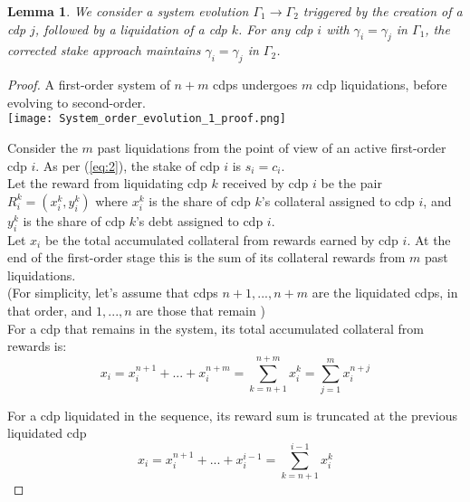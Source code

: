 \documentclass[reqno]{article}
\newtheorem{lemma}[theorem]{Lemma}
\begin{document}
\begin{lemma}\label{result:1} We consider a system evolution $\Gamma_1 \rightarrow \Gamma_2$ triggered by the creation of a cdp $j$, followed by a liquidation of a cdp $k$. For any cdp $i$ with $\gamma_i = \gamma_j$ in $\Gamma_1$, the corrected stake approach maintains $\gamma_i = \gamma_j$ in $\Gamma_2$.
\end{lemma}

\begin{proof}
A first-order system of $n+m$ cdps undergoes $m$ cdp liquidations, before evolving to second-order.\\

    \texttt{[image: System\_order\_evolution\_1\_proof.png]}

Consider the $m$ past liquidations from the point of view of an active first-order cdp $i$. As per (\ref{eq:2}), the stake of cdp $i$ is $s_i = c_i$.\\

Let the reward from liquidating cdp $k$ received by cdp $i$ be the pair $R_i^k = (x_i^k, y_i^k)$ where $x_i^k$ is the share of cdp $k$’s collateral assigned to cdp $i$, and $y_i^k$ is the share of cdp $k$’s debt assigned to cdp $i$.\\

Let $x_i$ be the total accumulated collateral from rewards earned by cdp $i$. At the end of the first-order stage this is the sum of its collateral rewards from $m$ past liquidations.\\

(For simplicity, let’s assume that cdps $n+1, ..., n+m$ are the liquidated cdps, in that order, and $1, ..., n$ are those that remain )\\

For a cdp that remains in the system, its total accumulated collateral from rewards is:\\

\begin{equation} \label{eq:collreward}
  x_i = x_i^{n+1} + ... + x_i^{n+m} = \sum_{k=n+1}^{n+m}x_i^k = \sum_{j=1}^{m}x_i^{n+j}
\end{equation}

For a cdp liquidated in the sequence, its reward sum is truncated at the previous liquidated cdp \\

\begin{equation}
  x_i = x_i^{n+1} + ... + x_i^{i-1} = \sum_{k=n+1}^{i-1}x_i^k
\end{equation}


\end{proof}
\end{document}
